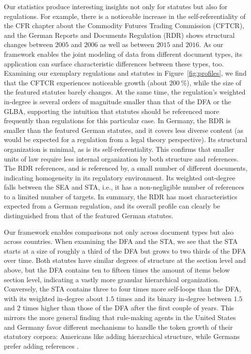 Our statistics produce interesting insights not only for statutes but also for regulations.
For example, there is a noticeable increase in the self-referentiality of the CFR chapter about the Commodity Futures Trading Commission (CFTCR),
and the German Reports and Documents Regulation (RDR) shows structural changes between $2005$ and $2006$ as well as between $2015$ and $2016$.
As our framework enables the joint modeling of data from different document types, its application can surface characteristic differences between these types, too.
Examining our exemplary regulations and statutes in Figure~\ref{fig:profiles},
we find that the CFTCR experiences noticeable growth (about $200~\%$),
while the size of the featured statutes barely changes.
At the same time, the regulation's weighted in-degree is several orders of magnitude smaller than that of the DFA or the GLBA, supporting the intuition that statutes should be referenced more frequently than regulations for this particular case. 
In Germany, the RDR is smaller than the featured German statutes,
and it covers less diverse content (as would be expected for a regulation from a legal theory perspective).
Its structural organization is minimal, as is its self-referentiality.
This confirms that smaller units of law require less internal organization by both structure and references.
The RDR references, and is referenced by, a small number of different documents, indicating homogeneity in its regulatory environment.
Its weighted out-degree falls between the SEA and STA, i.e., it has a non-negligible number of references to a limited number of targets.
In summary, the RDR has most characteristics expected from a German regulation, and its overall profile can clearly be distinguished from that of the featured German statutes.

Our framework enables comparisons not only across document types but also across countries.
When examining the DFA and the STA, we see that the STA starts at a size of roughly a third of the DFA but grows to two thirds of the DFA over time.
Both statutes have similar degrees of structure at the section level and above,
but the DFA contains ten to fifteen times the amount of items below section level, indicating a vastly more granular hierarchical organization.
Conversely, the STA contains three to four times more self-loops than the DFA, with its weighted in-degree about $1.5$ times and its binary in-degree between $1.5$ and $2$ times higher than those of the DFA after the first couple of years.
This mirrors the more general finding that rule-making agents in the United States and Germany favor different mechanisms to handle the token growth of their statutory corpora: 
Americans like adding hierarchical structure, while Germans prefer adding references \cite{katz2020}.

